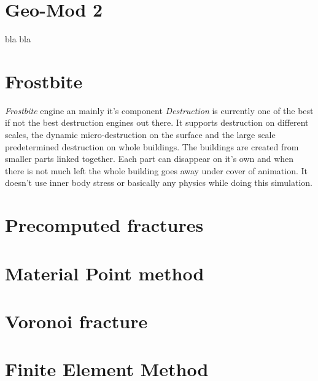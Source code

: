 \section{Geo-Mod 2}
bla bla
\section{Frostbite}
\emph{Frostbite}\cite{frostbite} engine an mainly it's component \emph{Destruction}\cite{destruction} is currently one of the best if not the best destruction engines out there. It supports destruction on different scales, the dynamic micro-destruction on the surface and the large scale predetermined destruction on whole buildings. The buildings are created from smaller parts linked together. Each part can disappear on it's own and when there is not much left the whole building goes away under cover of animation. 
It doesn't use inner body stress or basically any physics while doing this simulation.

\section{Precomputed fractures}

\section{Material Point method}

\section{Voronoi fracture}

\section{Finite Element Method}
